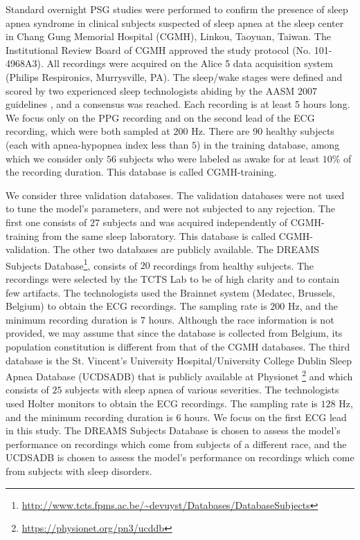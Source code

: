 \documentclass[10pt,a4paper,english]{amsart}
\begin{document}
Standard overnight PSG studies were performed to confirm the presence of sleep apnea syndrome in clinical subjects suspected of sleep apnea at the sleep center in Chang Gung Memorial Hospital (CGMH), Linkou, Taoyuan, Taiwan. The Institutional Review Board of CGMH approved the study protocol (No. 101-4968A3). All recordings were acquired on the Alice 5 data acquisition system (Philips Respironics, Murrysville, PA). 
The sleep/wake stages were defined and scored by two experienced sleep technologists abiding by the AASM 2007 guidelines \cite{Iber_Ancoli-Isreal_Chesson_Quan:2007}, and a consensus was reached.  
Each recording is at least 5 hours long. We focus only on the PPG recording and on the second lead of the ECG recording, which were both sampled at $200$ Hz. There are 90 healthy subjects (each with apnea-hypopnea index less than $5$) in the training database, among which we consider only $56$ subjects who were labeled as awake for at least $10\%$ of the recording duration.  This database is called CGMH-training. 

We consider three validation databases. The validation databases were not used to tune the model's parameters, and were not subjected to any rejection. The first one consists of $27$ subjects and was acquired independently of CGMH-training from the same sleep laboratory. This database is called CGMH-validation.
%
The other two databases are publicly available. The DREAMS Subjects Database\footnote{\url{http://www.tcts.fpms.ac.be/~devuyst/Databases/DatabaseSubjects}}, consists of $20$ recordings from healthy subjects. The recordings were selected by the TCTS Lab to be of high clarity and to contain few artifacts.  The technologists used the Brainnet\texttrademark{} system (Medatec, Brussels, Belgium) to obtain the ECG recordings. The sampling rate is $200$ $\mathrm{Hz}$, and the minimum recording duration is $7$ hours. Although the race information is not provided, we may assume that since the database is collected from Belgium, its population constitution is different from that of the CGMH databases.
%
The third database is the St. Vincent's University Hospital/University College Dublin Sleep Apnea Database (UCDSADB) that is publicly available at Physionet \cite{Goldberger_Amaral_Glass_Hausdorff_Ivanov_Mark_Mietus_Moody_Peng_Stanley:2000}\footnote{\url{https://physionet.org/pn3/ucddb}} and which consists of $25$ subjects with sleep apnea of various severities. The technologists used Holter monitors to obtain the ECG recordings. The sampling rate is $128$ $\mathrm{Hz}$, and the minimum recording duration is $6$ hours.  We focus on the first ECG lead in this study. The DREAMS Subjects Database is chosen to assess the model's performance on recordings which come from subjects of a different race, and the UCDSADB is chosen to assess the model's performance on recordings which come from subjects with sleep disorders.
\end{document}
